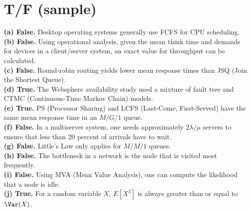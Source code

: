 \section*{T/F (sample)}
\textbf{(a) False.} Desktop operating systems generally use FCFS for CPU scheduling.\\
\textbf{(b) False.} Using operational analysis, given the mean think time and demands for devices in a client/server system, an exact value for throughput can be calculated.\\
\textbf{(c) False.} Round-robin routing yields lower mean response times than JSQ (Join the Shortest Queue).\\
\textbf{(d) True.} The Websphere availability study used a mixture of fault tree and CTMC (Continuous-Time Markov Chain) models.\\
\textbf{(e) True.} PS (Processor Sharing) and LCFS (Last-Come, First-Served) have the same mean response time in an $M/G/1$ queue.\\
\textbf{(f) False.} In a multiserver system, one needs approximately $2\lambda/\mu$ servers to ensure that less than 20 percent of arrivals have to wait.\\
\textbf{(g) False.} Little's Law only applies for $M/M/1$ queues.\\
\textbf{(h) False.} The bottleneck in a network is the node that is visited most frequently.\\
\textbf{(i) False.} Using MVA (Mean Value Analysis), one can compute the likelihood that a node is idle.\\
\textbf{(j) True.} For a random variable $X$, $E[X^2]$ is always greater than or equal to $\Var(X)$.
